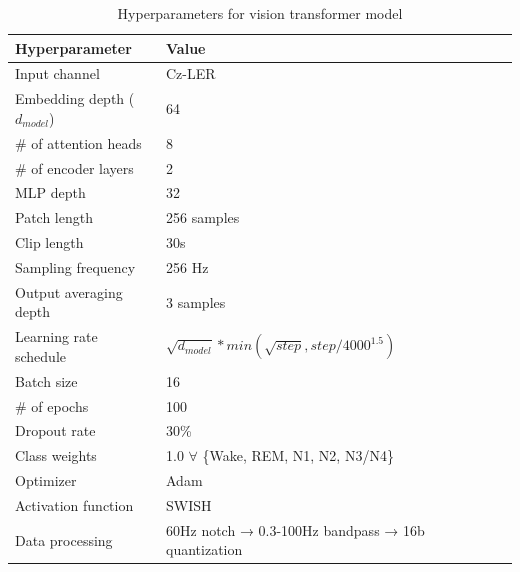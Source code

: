 \documentclass[12pt, hidelinks]{article}
\begin{document}
    \begin{table}[ht]
        \centering
        \renewcommand{\arraystretch}{1.2} %
        \setlength{\arrayrulewidth}{1.5pt} %
        \caption{Hyperparameters for vision transformer model}
        \begin{tabular}{@{} *6l @{}}
            \toprule
            Hyperparameter                  & Value &&&     \\\midrule
            Input channel                   & Cz-LER        \\
            Embedding depth ($d_{model}$)   & 64            \\
            \# of attention heads           & 8             \\
            \# of encoder layers            & 2             \\
            MLP depth                       & 32            \\
            Patch length                    & 256 samples   \\
            Clip length                     & 30s           \\
            Sampling frequency              & 256 Hz        \\
            Output averaging depth          & 3 samples     \\ \bottomrule 
            Learning rate schedule          & $\sqrt{d_{model}}*min(\sqrt{step}, step/4000^{1.5})$ \\
            Batch size                      & 16            \\
            \# of epochs                    & 100           \\
            Dropout rate                    & 30\%          \\
            Class weights                   & 1.0 $\forall$ \{Wake, REM, N1, N2, N3/N4\} \\
            Optimizer                       & Adam          \\
            Activation function             & SWISH         \\
            Data processing                 & 60Hz notch → 0.3-100Hz bandpass → 16b quantization \\            
            \hline
        \end{tabular}
        \label{tab:model_param}
    \end{table}
\end{document}
